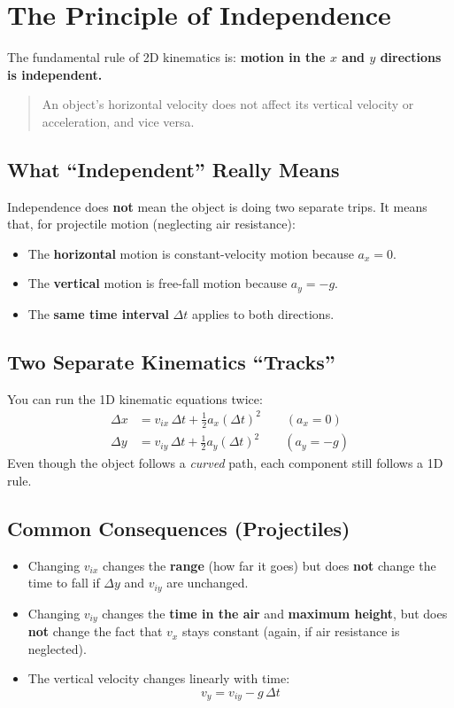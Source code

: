 \documentclass{article}
\begin{document}
\newpage
\section{The Principle of Independence}

The fundamental rule of 2D kinematics is: \textbf{motion in the $x$ and $y$ directions is independent.}
\begin{quote}
  An object's horizontal velocity does not affect its vertical velocity or acceleration, and vice versa.
\end{quote}

\subsection{What ``Independent'' Really Means}
Independence does \textbf{not} mean the object is doing two separate trips. It means that, for projectile motion (neglecting air resistance):
\begin{itemize}
  \item The \textbf{horizontal} motion is constant-velocity motion because $a_x = 0$.
  \item The \textbf{vertical} motion is free-fall motion because $a_y = -g$.
  \item The \textbf{same time interval} $\Delta t$ applies to both directions.
\end{itemize}

\subsection{Two Separate Kinematics ``Tracks''}
You can run the 1D kinematic equations twice:
\begin{align}
  \Delta x &= v_{ix}\,\Delta t + \tfrac{1}{2}a_x(\Delta t)^2 \qquad (a_x = 0) \\
  \Delta y &= v_{iy}\,\Delta t + \tfrac{1}{2}a_y(\Delta t)^2 \qquad (a_y = -g)
\end{align}
Even though the object follows a \emph{curved} path, each component still follows a 1D rule.

\subsection{Common Consequences (Projectiles)}
\begin{itemize}
  \item Changing $v_{ix}$ changes the \textbf{range} (how far it goes) but does \textbf{not} change the time to fall if $\Delta y$ and $v_{iy}$ are unchanged.
  \item Changing $v_{iy}$ changes the \textbf{time in the air} and \textbf{maximum height}, but does \textbf{not} change the fact that $v_x$ stays constant (again, if air resistance is neglected).
  \item The vertical velocity changes linearly with time:
    \begin{equation}
      v_y = v_{iy} - g\,\Delta t
    \end{equation}
\end{itemize}
\end{document}
